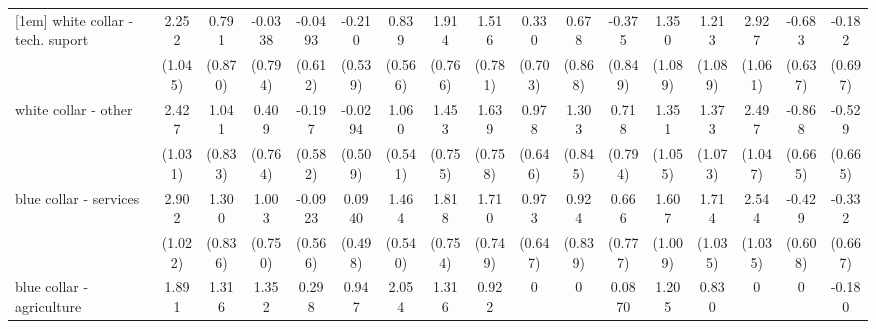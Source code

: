 {\begin{tabular}{l*{16}{c}}
[1em]
white collar - tech. suport&       2.252\sym{*}  &       0.791         &     -0.0338         &     -0.0493         &      -0.210         &       0.839         &       1.914\sym{*}  &       1.516         &       0.330         &       0.678         &      -0.375         &       1.350         &       1.213         &       2.927\sym{**} &      -0.683         &      -0.182         \\
                    &     (1.045)         &     (0.870)         &     (0.794)         &     (0.612)         &     (0.539)         &     (0.566)         &     (0.766)         &     (0.781)         &     (0.703)         &     (0.868)         &     (0.849)         &     (1.089)         &     (1.089)         &     (1.061)         &     (0.637)         &     (0.697)         \\
[1em]
white collar - other&       2.427\sym{*}  &       1.041         &       0.409         &      -0.197         &     -0.0294         &       1.060\sym{*}  &       1.453         &       1.639\sym{*}  &       0.978         &       1.303         &       0.718         &       1.351         &       1.373         &       2.497\sym{*}  &      -0.868         &      -0.529         \\
                    &     (1.031)         &     (0.833)         &     (0.764)         &     (0.582)         &     (0.509)         &     (0.541)         &     (0.755)         &     (0.758)         &     (0.646)         &     (0.845)         &     (0.794)         &     (1.055)         &     (1.073)         &     (1.047)         &     (0.665)         &     (0.665)         \\
[1em]
blue collar - services&       2.902\sym{**} &       1.300         &       1.003         &     -0.0923         &      0.0940         &       1.464\sym{**} &       1.818\sym{*}  &       1.710\sym{*}  &       0.973         &       0.924         &       0.666         &       1.607         &       1.714         &       2.544\sym{*}  &      -0.429         &      -0.332         \\
                    &     (1.022)         &     (0.836)         &     (0.750)         &     (0.566)         &     (0.498)         &     (0.540)         &     (0.754)         &     (0.749)         &     (0.647)         &     (0.839)         &     (0.777)         &     (1.009)         &     (1.035)         &     (1.035)         &     (0.608)         &     (0.667)         \\
[1em]
blue collar - agriculture&       1.891         &       1.316         &       1.352         &       0.298         &       0.947         &       2.054\sym{**} &       1.316         &       0.922         &           0         &           0         &      0.0870         &       1.205         &       0.830         &           0         &           0         &      -0.180         \\

\end{tabular}}
